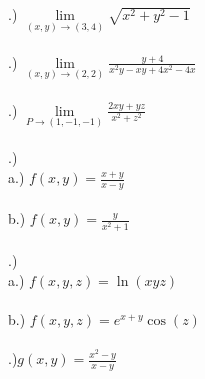 \documentclass[12pt]{article}
\begin{document}
.) $\lim\limits_{(x,y) \to (3,4)} \sqrt{x^{2} + y^{2} - 1}$\\\\
.) $\lim\limits_{(x,y) \to (2,2)} \frac{y+4}{x^{2}y -xy + 4x^{2} - 4x}$\\\\
.) $\lim\limits_{P \to (1, -1, -1)}\frac{2xy+yz}{x^{2}+z^{2}}$\\\\
.) \\
\noindent a.) $f(x, y) = \frac{x+y}{x-y}$\\\\
\noindent b.) $f(x,y) = \frac{y}{x^{2} + 1}$\\\\
.) \\
\noindent a.) $f(x, y,z) = \ln(xyz)$\\\\
\noindent b.) $f(x, y,z) = e^{x+y}\cos(z)$\\\\
.)$g(x,y) = \frac{x^{2}-y}{x -y}$\\\\
\end{document}
